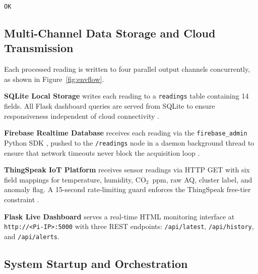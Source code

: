 \begin{algorithm}[H]
\DontPrintSemicolon
\caption{Six-Level CO$_2$ Alert Classification (Priority-Ordered)}
\label{alg:alert}
\BlankLine
{}
\Return \texttt{OK} 
\end{algorithm}



\subsection{Multi-Channel Data Storage and Cloud Transmission}

Each processed reading is written to four parallel output channels
concurrently, as shown in Figure~\ref{fig:envflow}.

\textbf{SQLite Local Storage} writes each reading to a
\texttt{readings} table containing 14 fields. All Flask dashboard
queries are served from SQLite to ensure responsiveness independent
of cloud connectivity \cite{r23}.

\textbf{Firebase Realtime Database} \cite{r35} receives each reading
via the \texttt{firebase\_admin} Python SDK \cite{r45}, pushed to the
\texttt{/readings} node in a daemon background thread to ensure that
network timeouts never block the acquisition loop \cite{r2}.

\textbf{ThingSpeak IoT Platform} \cite{r36} receives sensor readings
via HTTP GET with six field mappings for temperature, humidity,
CO$_2$~ppm, raw AQ, cluster label, and anomaly flag. A 15-second
rate-limiting guard enforces the ThingSpeak free-tier constraint
\cite{r1,r23}.

\textbf{Flask Live Dashboard} \cite{r37} serves a real-time HTML
monitoring interface at \texttt{http://<Pi-IP>:5000} with three REST
endpoints: \texttt{/api/latest}, \texttt{/api/history}, and
\texttt{/api/alerts}.

\subsection{System Startup and Orchestration}

